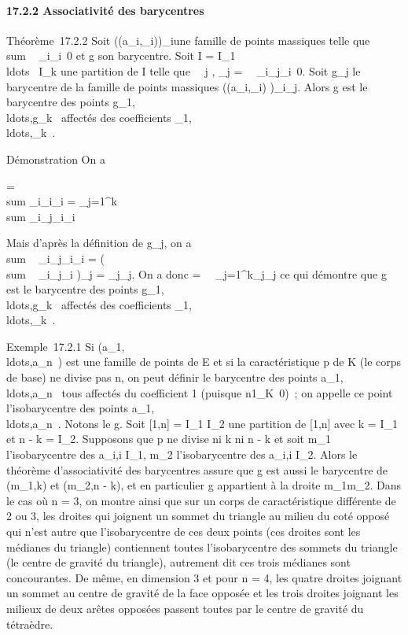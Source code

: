 \documentclass[]{article}
\begin{document}
\paragraph{17.2.2 Associativité des barycentres}

Théorème~17.2.2 Soit \left
((a_i,\lambda_i)\right )_i\inI une
famille de points massiques telle que
\\sum ~
_i\inI\lambda_i\neq~0 et g son
barycentre. Soit I = I_1
\cup\\ldots~ \cup
I_k une partition de I telle que \forall~~j \in
[1,k], \mu_j =\
\sum ~
_i\inI_j\lambda_i\neq~0. Soit
g_j le barycentre de la famille de points massiques
\left ((a_i,\lambda_i)\right
)_i\inI_j. Alors g est le barycentre des points
g_1,\\ldots,g_k~
affectés des coefficients
\mu_1,\\ldots,\mu_k~.

Démonstration On a

 = \\sum
_i\inI\lambda_i\overrightarrowga_i
= \sum _j=1^k~
\\sum
_i\inI_j\lambda_i\overrightarrowga_i

Mais d'après la définition de g_j, on a
\\sum ~
_i\inI_j\lambda_i\overrightarrowga_i
= \left
(\\sum ~
_i\inI_j\lambda_i\right
)\overrightarrowgg_j =
\mu_j\overrightarrowgg_j. On a donc
 =\
\sum ~
_j=1^k\mu_j\overrightarrowgg_j
ce qui démontre que g est le barycentre des points
g_1,\\ldots,g_k~
affectés des coefficients
\mu_1,\\ldots,\mu_k~.

Exemple~17.2.1 Si
(a_1,\\ldots,a_n~)
est une famille de points de E et si la caractéristique p de K (le corps
de base) ne divise pas n, on peut définir le barycentre des points
a_1,\\ldots,a_n~
tous affectés du coefficient 1 (puisque
n1_K\neq~0)~; on appelle ce point
l'isobarycentre des points
a_1,\\ldots,a_n~.
Notons le g. Soit [1,n] = I_1 \cup I_2 une partition
de [1,n] avec k = I_1 et n - k =
I_2. Supposons que p ne divise ni k ni n -
k et soit m_1 l'isobarycentre des a_i,i \in
I_1, m_2 l'isobarycentre des a_i,i \in
I_2. Alors le théorème d'associativité des barycentres assure
que g est aussi le barycentre de (m_1,k) et (m_2,n -
k), et en particulier g appartient à la droite m_1m_2.
Dans le cas où n = 3, on montre ainsi que sur un corps de
caractéristique différente de 2 ou 3, les droites qui joignent un sommet
du triangle au milieu du coté opposé qui n'est autre que l'isobarycentre
de ces deux points (ces droites sont les médianes du triangle)
contiennent toutes l'isobarycentre des sommets du triangle (le centre de
gravité du triangle), autrement dit ces trois médianes sont
concourantes. De même, en dimension 3 et pour n = 4, les quatre droites
joignant un sommet au centre de gravité de la face opposée et les trois
droites joignant les milieux de deux arêtes opposées passent toutes par
le centre de gravité du tétraèdre.
\end{document}

